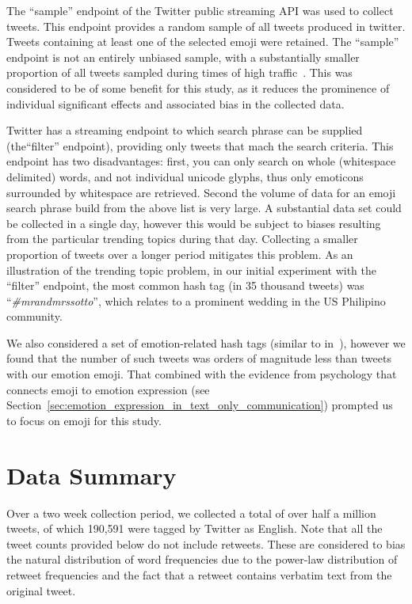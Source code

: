 \documentclass[10pt, a4paper]{article}
\begin{document}
The ``sample'' endpoint of the Twitter public streaming API was used to collect tweets. This endpoint provides a random sample of all tweets produced in twitter.
Tweets containing at least one of the selected emoji were retained. The ``sample'' endpoint is not an entirely unbiased sample, with a substantially smaller proportion of all tweets sampled during times of high traffic~\cite{Morstatter2013Is}. This was considered to be of some benefit for this study, as it reduces the prominence of individual significant effects and associated bias in the collected data.

Twitter has a streaming endpoint to which search phrase can be supplied (the``filter'' endpoint), providing only tweets that mach the search criteria.
This endpoint has two disadvantages: first, you can only search on whole (whitespace delimited) words, and not individual unicode glyphs, thus only emoticons surrounded by whitespace are retrieved. 
Second the volume of data for an emoji search phrase build from the above list is very large. A substantial data set could be collected in a single day, however this would be subject to biases resulting from the particular trending topics during that day. 
Collecting a smaller proportion of tweets over a longer period mitigates this problem.
As an illustration of the trending topic problem, in our initial experiment with the ``filter'' endpoint, the most common hash tag (in 35 thousand tweets) was ``\emph{\#mrandmrssotto}'', which relates to a prominent wedding in the US Philipino community.

We also considered a set of emotion-related hash tags (similar to in~\cite{Mohammad2012Emotional}), however we found that the number of such tweets was orders of magnitude less than tweets with our emotion emoji. That combined with the evidence from psychology that connects emoji to emotion expression (see Section~\ref{sec:emotion_expression_in_text_only_communication}) prompted us to focus on emoji for this study.

\section{Data Summary}
Over a two week collection period, we collected a total of over half a million tweets, of which 190,591 were tagged by Twitter as English.
Note that all the tweet counts provided below do not include retweets. 
These are considered to bias the natural distribution of word frequencies due to the power-law distribution of retweet frequencies and the fact that a retweet contains verbatim text from the original tweet.
\end{document}
